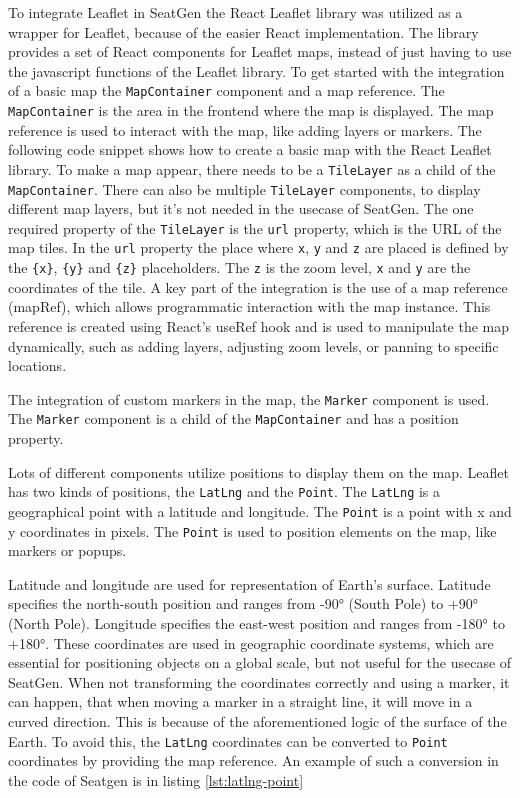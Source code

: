 To integrate Leaflet in SeatGen the React Leaflet library was utilized as a wrapper for Leaflet, because of the easier React implementation. The library provides a set of React components for Leaflet maps, instead of just having to use the javascript functions of the Leaflet library. To get started with the integration of a basic map the \texttt{MapContainer} component and a map reference. The \texttt{MapContainer} is the area in the frontend where the map is displayed. The map reference is used to interact with the map, like adding layers or markers. The following code snippet shows how to create a basic map with the React Leaflet library. To make a map appear, there needs to be a \texttt{TileLayer} as a child of the \texttt{MapContainer}. There can also be multiple \texttt{TileLayer} components, to display different map layers, but it's not needed in the usecase of SeatGen. The one required property of the \texttt{TileLayer} is the \texttt{url} property, which is the URL of the map tiles. In the \texttt{url} property the place where \texttt{x}, \texttt{y} and \texttt{z} are placed is defined by the \texttt{\{x\}}, \texttt{\{y\}} and \texttt{\{z\}} placeholders. The \texttt{z} is the zoom level, \texttt{x} and \texttt{y} are the coordinates of the tile. A key part of the integration is the use of a map reference (mapRef), which allows programmatic interaction with the map instance. This reference is created using React’s useRef hook and is used to manipulate the map dynamically, such as adding layers, adjusting zoom levels, or panning to specific locations.

The integration of custom markers in the map, the \texttt{Marker} component is used. The \texttt{Marker} component is a child of the \texttt{MapContainer} and has a position property.

Lots of different components utilize positions to display them on the map. Leaflet has two kinds of positions, the \texttt{LatLng} and the \texttt{Point}. The \texttt{LatLng} is a geographical point with a latitude and longitude. The \texttt{Point} is a point with x and y coordinates in pixels. The \texttt{Point} is used to position elements on the map, like markers or popups. 

Latitude and longitude are used for representation of Earth's surface. Latitude specifies the north-south position and ranges from -90° (South Pole) to +90° (North Pole). Longitude specifies the east-west position and ranges from -180° to +180°. These coordinates are used in geographic coordinate systems, which are essential for positioning objects on a global scale, but not useful for the usecase of SeatGen. When not transforming the coordinates correctly and using a marker, it can happen, that when moving a marker in a straight line, it will move in a curved direction. This is because of the aforementioned logic of the surface of the Earth. To avoid this, the \texttt{LatLng} coordinates can be converted to \texttt{Point} coordinates by providing the map reference. An example of such a conversion in the code of Seatgen is in listing \ref{lst:latlng-point}

